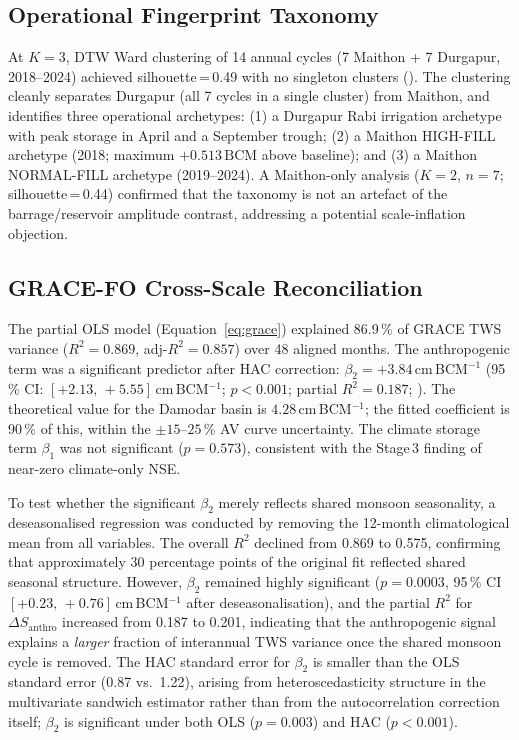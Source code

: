 \documentclass[preprint,12pt,authoryear]{elsarticle}
\newcommand{\dSanthro}{\Delta S_{\mathrm{anthro}}}
\newcommand{\BCM}{\,\mathrm{BCM}}
\begin{document}
\subsection{Operational Fingerprint Taxonomy}
\label{sec:res_dtw}

At $K = 3$, DTW Ward clustering of 14 annual cycles (7 Maithon + 7 Durgapur,
2018--2024) achieved silhouette\,=\,0.49 with no singleton clusters
(). The clustering cleanly separates Durgapur (all 7
cycles in a single cluster) from Maithon, and identifies three operational
archetypes: (1) a Durgapur Rabi irrigation archetype with peak storage in
April and a September trough; (2) a Maithon HIGH-FILL archetype (2018; maximum
$+0.513\BCM$ above baseline); and (3) a Maithon NORMAL-FILL archetype
(2019--2024). A Maithon-only analysis ($K = 2$, $n = 7$; silhouette\,=\,0.44)
confirmed that the taxonomy is not an artefact of the barrage/reservoir
amplitude contrast, addressing a potential scale-inflation objection.

\subsection{GRACE-FO Cross-Scale Reconciliation}
\label{sec:res_grace}

The partial OLS model (Equation~\ref{eq:grace}) explained 86.9\,\% of GRACE
TWS variance ($R^2 = 0.869$, adj-$R^2 = 0.857$) over 48 aligned months.
The anthropogenic term was a significant predictor after HAC correction:
$\beta_2 = +3.84$\,cm\,BCM$^{-1}$ (95\,\% CI: $[+2.13,\,+5.55]$\,cm\,BCM$^{-1}$;
$p < 0.001$; partial $R^2 = 0.187$; ). The theoretical value
for the Damodar basin is $4.28$\,cm\,BCM$^{-1}$; the fitted coefficient is
90\,\% of this, within the $\pm 15$--$25$\,\% AV curve uncertainty.
The climate storage term $\beta_1$ was not significant ($p = 0.573$),
consistent with the Stage\,3 finding of near-zero climate-only NSE.

To test whether the significant $\beta_2$ merely reflects shared monsoon
seasonality, a deseasonalised regression was conducted by removing the
12-month climatological mean from all variables. The overall $R^2$ declined
from 0.869 to 0.575, confirming that approximately 30 percentage points of
the original fit reflected shared seasonal structure. However, $\beta_2$
remained highly significant ($p = 0.0003$, 95\,\% CI
$[+0.23,\,+0.76]$\,cm\,BCM$^{-1}$ after deseasonalisation), and the partial
$R^2$ for $\dSanthro$ increased from 0.187 to 0.201, indicating that the
anthropogenic signal explains a \textit{larger} fraction of interannual TWS
variance once the shared monsoon cycle is removed. The HAC standard error for
$\beta_2$ is smaller than the OLS standard error (0.87 vs.\ 1.22), arising
from heteroscedasticity structure in the multivariate sandwich estimator
rather than from the autocorrelation correction itself; $\beta_2$ is
significant under both OLS ($p = 0.003$) and HAC ($p < 0.001$).
\end{document}
